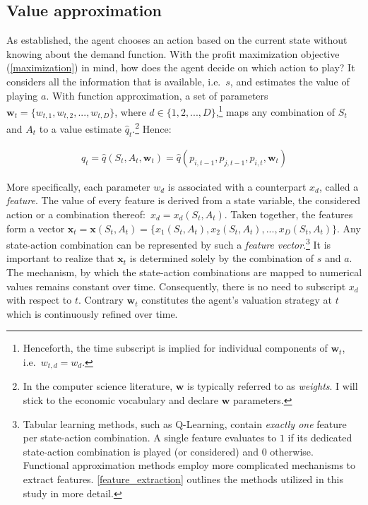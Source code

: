 \subsection{Value approximation}\label{value_approximation}

As established, the agent chooses an action based on the current state without knowing about the demand function. With the profit maximization objective (\autoref{maximization}) in mind, how does the agent decide on which action to play? It considers all the information that is available, i.e.\ $s$, and estimates the value of playing $a$. With function approximation, a set of parameters $\boldsymbol{w}_t = \{w_{t, 1}, w_{t, 2}, ..., w_{t, D}\}$, where $d \in \{1, 2, ..., D\}$,\footnote{Henceforth, the time subscript is implied for individual components of $\boldsymbol{w}_t$, i.e.\ $w_{t,d} = w_d$.} maps any combination of $S_t$ and $A_t$ to a value estimate $\hat{q}_t$.\footnote{In the computer science literature, $\boldsymbol{w}$ is typically referred to as \emph{weights}. I will stick to the economic vocabulary and declare $\boldsymbol{w}$ parameters.} Hence:

\begin{gather}\label{q_estimation}
	\hat{q}_t = \hat{q}(S_t,A_t,\boldsymbol{w}_t) = \hat{q}(p_{i, t-1}, p_{j, t-1}, p_{i, t}, \boldsymbol{w}_t)
\end{gather}

More specifically, each parameter $w_d$ is associated with a counterpart $x_d$, called a \emph{feature}. The value of every feature is derived  from a state variable, the considered action or a combination thereof:\ $x_d = x_d(S_t, A_t)$. Taken together, the features form a vector $\boldsymbol{x}_t = \boldsymbol{x}(S_t, A_t) = \{x_1(S_t, A_t), x_2(S_t, A_t), ..., x_D(S_t, A_t)\}$. Any state-action combination can be represented by such a \emph{feature vector}.\footnote{Tabular learning methods, such as Q-Learning, contain \emph{exactly one} feature per state-action combination. A single feature evaluates to $1$ if its dedicated state-action combination is played (or considered) and $0$ otherwise. Functional approximation methods employ more complicated mechanisms to extract features. \autoref{feature_extraction} outlines the methods utilized in this study in more detail.} It is important to realize that $\boldsymbol{x}_t$ is determined solely by the combination of $s$ and $a$. The mechanism, by which the state-action combinations are mapped to numerical values remains constant over time. Consequently, there is no need to subscript $x_d$ with respect to $t$. Contrary $\boldsymbol{w}_t$ constitutes the agent's valuation strategy at $t$ which is continuously refined over time.

